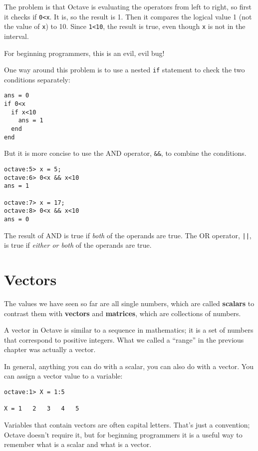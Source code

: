 The problem is that Octave is evaluating the operators from left
to right, so first it checks if {\tt 0<x}. It is, so the result
is 1. Then it compares the logical value 1 (not the value of
{\tt x}) to 10. Since {\tt 1<10}, the result is true, even though
{\tt x} is not in the interval.

For beginning programmers, this is an evil, evil bug!

One way around this problem is to use a nested {\tt if} statement to
check the two conditions separately:

\begin{verbatim}
ans = 0
if 0<x
  if x<10
    ans = 1
  end
end
\end{verbatim}

But it is more concise to use the AND operator, {\tt \&\&}, to
combine the conditions.

\begin{verbatim}
octave:5> x = 5;
octave:6> 0<x && x<10
ans = 1

octave:7> x = 17;
octave:8> 0<x && x<10
ans = 0
\end{verbatim}

The result of AND is true if {\em both} of the operands are
true. The OR operator, {\tt ||}, is true if {\em either or both}
of the operands are true.


\section{Vectors}

The values we have seen so far are all single numbers,
which are called {\bf scalars} to contrast them with {\bf vectors}
and {\bf matrices}, which are collections of numbers.

A vector in Octave is similar to a sequence in mathematics;
it is a set of numbers that correspond to positive integers. 
What
we called a ``range'' in the previous chapter was actually a
vector.

In general, anything you can do with a scalar, you can also do with
a vector. You can assign a vector value to a variable:

\begin{verbatim}
octave:1> X = 1:5

X = 1   2   3   4   5
\end{verbatim}

Variables that contain vectors are often capital letters. That's
just a convention; Octave doesn't require it, but for beginning
programmers it is a useful way to remember what is a scalar and
what is a vector.

